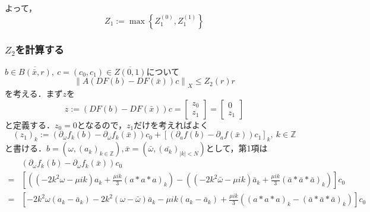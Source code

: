 \documentclass[11pt,a4paper]{jsarticle}
\theoremstyle{definition}
\begin{document}
よって，
\begin{equation*}
  Z_1 := \max \left\{ Z_1^{(0)}, Z_1^{(1)} \right\}
\end{equation*}

\subsubsection{$Z_2$を計算する}
$b \in \overline{B\left(\bar{x},r\right)},\ c=\left(c_0,c_1\right)\in\overline{Z(0,1)}$について
\begin{equation*}
  \left\| A \left( DF \left( b \right) - DF \left( \bar{x} \right) \right) c \right\|_X \leq Z_2(r)r
\end{equation*}
を考える．まず$z$を
\begin{equation*}
  z := \left( DF(b) - DF(\bar{x}) \right) c = \begin{bmatrix}
    z_0 \\
    z_1
  \end{bmatrix}
  = \begin{bmatrix}
    0 \\
    z_1
  \end{bmatrix}
\end{equation*}
と定義する．$z_0=0$となるので，$z_1$だけを考えればよく
\begin{equation*}
  \left(z_1\right)_k := \left(\partial_\omega f_k \left(b\right) - \partial_\omega f_k \left(\bar{x}\right) \right)c_0 + \left[ \left(\partial_a f\left(b\right) - \partial_a f \left(\bar{x}\right) \right) c_1 \right]_k,\ k \in \mathbb{Z}
\end{equation*}
と書ける．$b=\left( \omega, \left(a_k\right)_{k\in\mathbb{Z}} \right), \bar{x}=\left( \bar{\omega}, \left(\bar{a_k}\right)_{|k|<N} \right)$として，第1項は
\begin{equation*}
  \begin{split}
    &\left(\partial_\omega f_k \left(b\right) - \partial_\omega f_k \left(\bar{x}\right) \right)c_0 \\
    =& \left[ \left( \left( -2k^2\omega - \mu ik \right) a_k + \frac{\mu ik}{3} \left( a*a*a \right)_k \right) - \left( \left( -2k^2\bar{\omega} - \mu ik \right) \bar{a}_k       + \frac{\mu ik}{3} \left( \bar{a}*\bar{a}*\bar{a} \right)_k \right) \right]c_0 \\
    =& \left[  -2k^2\omega \left( a_k - \bar{a}_k \right) -2k^2\left( \omega - \bar{\omega} \right)\bar{a}_k - \mu ik \left( a_k - \bar{a}_k \right) + \frac{\mu ik}{3} \left( \left( a*a*a \right)_k - \left(\bar{a}*\bar{a}*\bar{a}\right)_k \right) \right] c_0
  \end{split}
\end{equation*}
\end{document}
